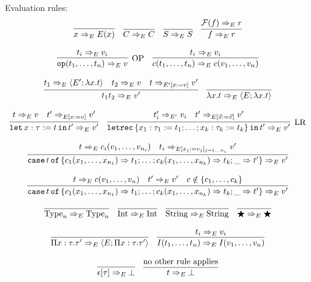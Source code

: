 \documentclass[
    9pt,            %
    techreport,        %
    affiltop,       %
]{art}
\begin{document}
Evaluation rules:
\[
\begin{array}{c}
\infer{\eval{x}{E}{E(x)}}{}\quad
\infer{\eval{C}{E}{C}}{}\quad
\infer{\eval{S}{E}{S}}{}\quad
\infer{\eval{f}{E}{r}}{\eval{\Fc(f)}{E}{r}}
\\ \\
\infer[\mathrm{OP}]{\eval{\op(t_1,\ldots,t_n)}{E}{v}}{\eval{t_i}{E}{v_i}}\quad
\infer{\eval{c(t_1,\ldots,t_n)}{E}{c(v_1,\ldots,v_n)}}{\eval{t_i}{E}{v_i}}
\\ \\
\infer{\eval{t_1 t_2}{E}{v'}}{\eval{t_1}{E}{\closure{E'}{\lambda x . t}} & \eval{t_2}{E}{v} & \eval{t}{E'[x:=v]}{v'}} \quad
\infer{\eval{\lambda x . t}{E}{\closure{E}{\lambda x . t}}}{}
\\ \\
\infer{\eval{\slet{x:\tau := t}{t'}}{E}{v'}}{\eval{t}{E}{v} & \eval{t'}{E[x:=v]}{v'}}\quad
\infer[\mathrm{LR}]{\eval{\sletrec{\{x_1 : \tau_1 := t_1; \ldots; x_k : \tau_k := t_k\}}{t'}}{E}{v'}}{\eval{t_i'}{E'}{v_i} & \eval{t'}{E[\vec{x}:=\vec{v}]}{v'}}
\\ \\
\infer{\eval{\scase{t}{\{c_1(x_1,\ldots,x_{n_1}) \To t_1; \ldots; c_k(x_1,\ldots,x_{n_k}) \To t_k; \_ \To t'\}}}{E}{v'}}{\eval{t}{E}{c_i(v_1,\ldots,v_{n_i})} & \eval{t_i}{E[x_j := v_j]_{j=1\ldots n_i}}{v'}}
\\ \\
\infer{\eval{\scase{t}{\{c_1(x_1,\ldots,x_{n_1}) \To t_1; \ldots; c_k(x_1,\ldots,x_{n_k}) \To t_k; \_ \To t'\}}}{E}{v'}}{\eval{t}{E}{c(v_1,\ldots,v_n)} & \eval{t'}{E}{v'} & c \notin \{c_1,\ldots,c_k\}}
\\ \\
\infer{\eval{\Type_n}{E}{\Type_n}}{}\quad
\infer{\eval{\Int}{E}{\Int}}{}\quad
\infer{\eval{\String}{E}{\String}}{}\quad
\infer{\eval{\Dynamic}{E}{\Dynamic}}{}
\\ \\
\infer{\eval{\Pi x : \tau . \tau'}{E}{\closure{E}{\Pi x : \tau . \tau'}}}{}\quad
\infer{\eval{I(t_1,\ldots,t_n)}{E}{I(v_1,\ldots,v_n)}}{\eval{t_i}{E}{v_i}}
\\ \\
\infer{\eval{\epsilon[\tau]}{E}{\bot}}{}\quad
\infer{\eval{t}{E}{\bot}}{\text{no other rule applies}}
\end{array}
\]
\end{document}
